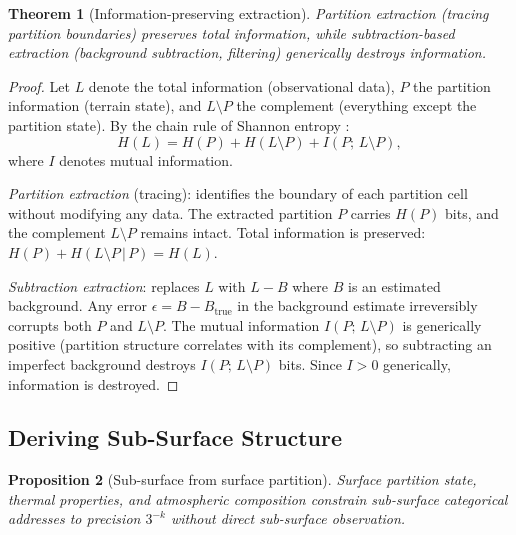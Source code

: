 \documentclass[10pt,twocolumn]{article}
\newtheorem{theorem}{Theorem}[section]
\newtheorem{proposition}[theorem]{Proposition}
\theoremstyle{definition}
\theoremstyle{remark}
\begin{document}
\begin{theorem}[Information-preserving extraction]
\label{thm:extraction}
Partition extraction (tracing partition boundaries) preserves
total information, while subtraction-based extraction
(background subtraction, filtering) generically destroys
information.
\end{theorem}

\begin{proof}
Let $L$ denote the total information (observational data), $P$
the partition information (terrain state), and $L\setminus P$
the complement (everything except the partition state).
By the chain rule of Shannon entropy \citep{Shannon1948}:
\begin{equation}\label{eq:chain}
  H(L) = H(P) + H(L\setminus P) + I(P;\,L\setminus P),
\end{equation}
where $I$ denotes mutual information.

\emph{Partition extraction} (tracing): identifies the boundary
of each partition cell without modifying any data.  The
extracted partition $P$ carries $H(P)$ bits, and the complement
$L\setminus P$ remains intact.  Total information is preserved:
$H(P) + H(L\setminus P\,|\,P) = H(L)$.

\emph{Subtraction extraction}: replaces $L$ with $L-B$ where
$B$ is an estimated background.  Any error $\epsilon = B-B_{\mathrm{true}}$
in the background estimate irreversibly corrupts both $P$ and
$L\setminus P$.  The mutual information
$I(P;\,L\setminus P)$ is generically positive (partition
structure correlates with its complement), so subtracting an
imperfect background destroys $I(P;\,L\setminus P)$ bits.
Since $I>0$ generically, information is destroyed.
\end{proof}

\subsection{Deriving Sub-Surface Structure}
\label{sec:subsurface}

\begin{proposition}[Sub-surface from surface partition]
\label{prop:subsurface}
Surface partition state, thermal properties, and atmospheric
composition constrain sub-surface categorical addresses to
precision $3^{-k}$ without direct sub-surface observation.
\end{proposition}
\end{document}

